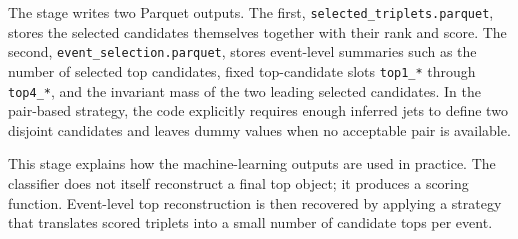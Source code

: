 \documentclass[11pt]{article}
\begin{document}
The stage writes two Parquet outputs. The first, \texttt{selected\_triplets.parquet}, stores the selected candidates themselves together with their rank and score. The second, \texttt{event\_selection.parquet}, stores event-level summaries such as the number of selected top candidates, fixed top-candidate slots \texttt{top1\_*} through \texttt{top4\_*}, and the invariant mass of the two leading selected candidates. In the pair-based strategy, the code explicitly requires enough inferred jets to define two disjoint candidates and leaves dummy values when no acceptable pair is available.

This stage explains how the machine-learning outputs are used in practice. The classifier does not itself reconstruct a final top object; it produces a scoring function. Event-level top reconstruction is then recovered by applying a strategy that translates scored triplets into a small number of candidate tops per event.
\end{document}
